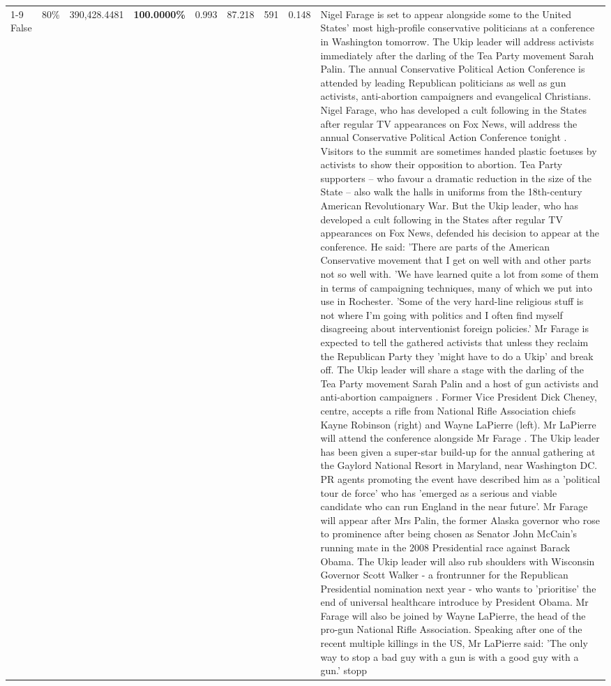 \begin{table}[H]
\begin{tabular}{lllrlllll}
\cline{1-9} \cline{2-9}
False & 80\% & 390,428.4481 & \bfseries \color{red} 100.0000\% & 0.993 & 87.218 & 591 & 0.148 & Nigel Farage is set to appear alongside some to the United States' most high-profile conservative politicians at a conference in Washington tomorrow. The Ukip leader will address activists immediately after the darling of the Tea Party movement Sarah Palin. The annual Conservative Political Action Conference is attended by leading Republican politicians as well as gun activists, anti-abortion campaigners and evangelical Christians. Nigel Farage, who has developed a cult following in the States after regular TV appearances on Fox News, will address the annual Conservative Political Action Conference tonight . Visitors to the summit are sometimes handed plastic foetuses by activists to show their opposition to abortion. Tea Party supporters – who favour a dramatic reduction in the size of the State – also walk the halls in uniforms from the 18th-century American Revolutionary War. But the Ukip leader, who has developed a cult following in the States after regular TV appearances on Fox News, defended his decision to appear at the conference. He said: 'There are parts of the American Conservative movement that I get on well with and other parts not so well with. 'We have learned quite a lot from some of them in terms of campaigning techniques, many of which we put into use in Rochester. 'Some of the very hard-line religious stuff is not where I'm going with politics and I often find myself disagreeing about interventionist foreign policies.' Mr Farage is expected to tell the gathered activists that unless they reclaim the Republican Party they 'might have to do a Ukip' and break off. The Ukip leader will share a stage with the darling of the Tea Party movement Sarah Palin and a host of gun activists and anti-abortion campaigners . Former Vice President Dick Cheney, centre, accepts a rifle from National Rifle Association chiefs Kayne Robinson (right) and Wayne LaPierre (left). Mr LaPierre will attend the conference alongside Mr Farage . The Ukip leader has been given a super-star build-up for the annual gathering at the Gaylord National Resort in Maryland, near Washington DC. PR agents promoting the event have described him as a 'political tour de force' who has 'emerged as a serious and viable candidate who can run England in the near future'. Mr Farage will appear after Mrs Palin, the former Alaska governor who rose to prominence after being chosen as Senator John McCain's running mate in the 2008 Presidential race against Barack Obama. The Ukip leader will also rub shoulders with Wisconsin Governor Scott Walker - a frontrunner for the Republican Presidential nomination next year - who wants to 'prioritise' the end of universal healthcare introduce by President Obama. Mr Farage will also be joined by Wayne LaPierre, the head of the pro-gun National Rifle Association. Speaking after one of the recent multiple killings in the US, Mr LaPierre said: 'The only way to stop a bad guy with a gun is with a good guy with a gun.' stopp \\

\end{tabular}
\end{table}
